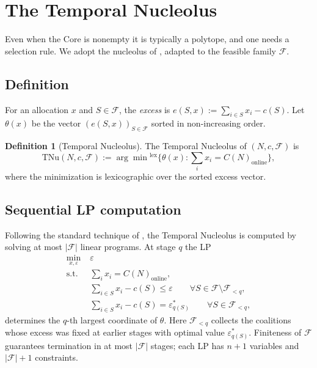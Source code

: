 \documentclass[11pt]{article}
\theoremstyle{plain}
\theoremstyle{definition}
\newtheorem{definition}[theorem]{Definition}
\theoremstyle{remark}
\newcommand{\F}{\mathcal{F}}
\begin{document}
\section{The Temporal Nucleolus}
\label{sec:nucleolus}

Even when the Core is nonempty it is typically a polytope, and one needs a selection rule. We adopt the nucleolus of \citet{schmeidler1969nucleolus}, adapted to the feasible family $\F$.

\subsection{Definition}
For an allocation $x$ and $S\in\F$, the \emph{excess} is $e(S, x) := \sum_{i\in S} x_i - c(S)$. Let $\theta(x)$ be the vector $(e(S,x))_{S\in\F}$ sorted in non-increasing order.

\begin{definition}[Temporal Nucleolus]
\label{def:tnu}
The Temporal Nucleolus of $(N, c, \F)$ is
\[
\mathrm{TNu}(N,c,\F) := \arg\!\min{}^{\text{lex}} \bigl\{ \theta(x) : \textstyle\sum_i x_i = C(N)_{\text{online}}\bigr\},
\]
where the minimization is lexicographic over the sorted excess vector.
\end{definition}

\subsection{Sequential LP computation}

Following the standard technique of \citet{guajardo2015nucleolus}, the Temporal Nucleolus is computed by solving at most $|\F|$ linear programs. At stage $q$ the LP
\begin{equation}
\label{eq:lp-q}
\begin{aligned}
\min_{x,\varepsilon} \;& \varepsilon \\
\text{s.t. } \;& \sum_{i} x_i = C(N)_{\text{online}}, \\
& \sum_{i\in S} x_i - c(S) \le \varepsilon \qquad \forall S\in\F\setminus\F_{<q}, \\
& \sum_{i\in S} x_i - c(S) = \varepsilon_{q(S)}^{\ast} \qquad \forall S\in\F_{<q},
\end{aligned}
\end{equation}
determines the $q$-th largest coordinate of $\theta$. Here $\F_{<q}$ collects the coalitions whose excess was fixed at earlier stages with optimal value $\varepsilon_{q(S)}^{\ast}$. Finiteness of $\F$ guarantees termination in at most $|\F|$ stages; each LP has $n+1$ variables and $|\F|+1$ constraints.
\end{document}
